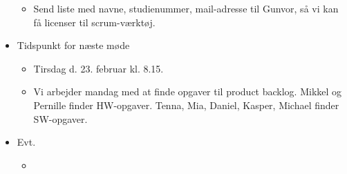\documentclass{article}
\begin{document}
\begin{itemize}
\begin{itemize}
			\item Send liste med navne, studienummer, mail-adresse til Gunvor, så vi kan få licenser til scrum-værktøj. 
		\end{itemize}
	\item Tidspunkt for næste møde 
		\begin{itemize}
			\item Tirsdag d. 23. februar kl. 8.15. 
			\item Vi arbejder mandag med at finde opgaver til product backlog. 
			\subitem Mikkel og Pernille finder HW-opgaver. 
			\subitem Tenna, Mia, Daniel, Kasper, Michael finder SW-opgaver. 
		\end{itemize}
	\item Evt. 
		\begin{itemize}
			\item 
		\end{itemize}
	\end{itemize}
\end{document}
